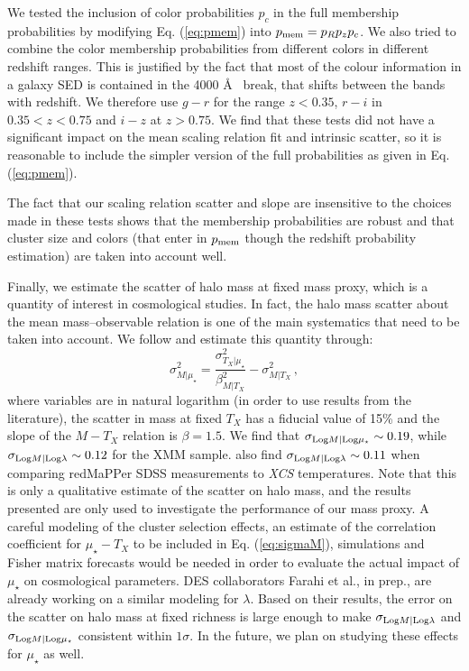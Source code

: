 We tested the inclusion of color probabilities $p_c$ in the full membership probabilities by modifying Eq. (\ref{eq:pmem}) into $p_{\rm mem} = p_R p_z p_c$. We also tried to combine the color membership probabilities from different colors in different redshift ranges. This is justified by the fact that most of the colour information in a galaxy SED is contained in the 4000 \AA~ break, that shifts between the bands with redshift. We therefore use $g-r$ for the range $z<0.35$, $r-i$ in $0.35<z<0.75$ and $i-z$ at $z>0.75$. We find that these tests did not have a significant impact on the mean scaling relation fit and intrinsic scatter, so it is reasonable to include the simpler version of the full probabilities as given in Eq. (\ref{eq:pmem}).

The fact that our scaling relation scatter and slope are insensitive to the choices made in these tests shows that the membership probabilities are robust and that cluster size and colors (that enter in $p_{\rm mem}$ though the redshift probability estimation) are taken into account well.

Finally, we estimate the scatter of halo mass at fixed mass proxy, which is a quantity of interest in cosmological studies. In fact, the halo mass scatter about the mean mass--observable relation is one of the main systematics that need to be taken into account. We follow \citet{2014ApJ...783...80R} and estimate this quantity through:
\begin{equation}
\sigma^2_{M|\mu_\star} = \frac{\sigma^2_{T_X|\mu_\star}}{\beta^2_{M|T_X}}-\sigma^2_{M|T_X}\, , \label{eq:sigmaM}
\end{equation}
where variables are in natural logarithm (in order to use results from the literature), the scatter in mass at fixed $T_X$ has a fiducial value of 15\% and the slope of the $M-T_X$ relation is $\beta=1.5$. We find that $\sigma_{{\rm Log}M|{\rm Log}\mu_\star} \sim 0.19$, while $\sigma_{{\rm Log}M|{\rm Log}\lambda} \sim 0.12$ for the XMM sample. \citet{2014ApJ...783...80R} also find $\sigma_{{\rm Log}M|{\rm Log}\lambda} \sim 0.11$ when comparing redMaPPer SDSS measurements to \emph{XCS} temperatures. Note that this is only a qualitative estimate of the scatter on halo mass, and the results presented are only used to investigate the performance of our mass proxy. A careful modeling of the cluster selection effects, an estimate of the correlation coefficient for $\mu_\star-T_X$ to be included in Eq. (\ref{eq:sigmaM}), simulations and Fisher matrix forecasts would be needed in order to evaluate the actual impact of $\mu_\star$ on cosmological parameters. DES collaborators Farahi et al., in prep., are already working on a similar modeling for $\lambda$. Based on their results, the error on the scatter on halo mass at fixed richness is large enough to make $\sigma_{{\rm Log}M|{\rm Log}\lambda}$ and $\sigma_{{\rm Log}M|{\rm Log}\mu_\star}$ consistent within $1\sigma$. In the future, we plan on studying these effects for $\mu_\star$ as well.

